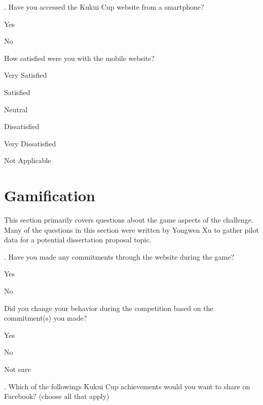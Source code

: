 \vspace{5 mm}
. Have you accessed the Kukui Cup website from a smartphone?

\begin{radiobutton}
	\item Yes
	\item No
\end{radiobutton}

\noindent
[If Yes] How satisfied were you with the mobile website?

\begin{radiobutton}
	\item Very Satisfied
	\item Satisfied
	\item Neutral
	\item Dissatisfied
	\item Very Dissatisfied
	\item Not Applicable
\end{radiobutton}


\section{Gamification}

This section primarily covers questions about the game aspects of the challenge. Many of the questions in this section were written by Yongwen Xu to gather pilot data for a potential dissertation proposal topic.

\vspace{5 mm}
. Have you made any commitments through the website during the game?

\begin{radiobutton}
	\item Yes
	\item No
\end{radiobutton}

\noindent
[If Yes] Did you change your behavior during the competition based on the commitment(s) you made?

\begin{radiobutton}
	\item Yes
	\item No
	\item Not sure
\end{radiobutton}

\vspace{5 mm}
. Which of the followings Kukui Cup achievements would you want to share on Facebook? (choose all that apply)

